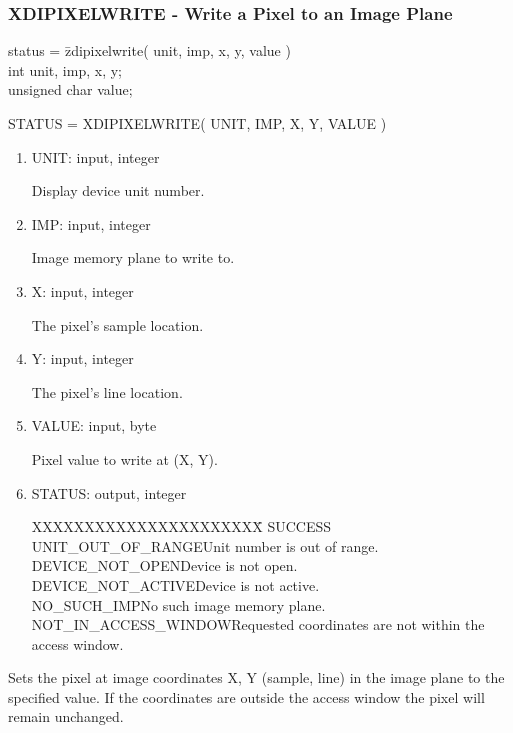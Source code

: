 \subsubsection{XDIPIXELWRITE - Write a Pixel to an Image Plane}
\begin{tabbing}
status = \=zdipixelwrite( unit, imp, x, y, value )\\
\>int  unit, imp, x, y;\\
\>unsigned char  value;\\
\end{tabbing}
STATUS = XDIPIXELWRITE( UNIT, IMP, X, Y, VALUE )
\begin{enumerate}
\item UNIT:  input, integer

Display device unit number.
\item IMP:  input, integer

Image memory plane to write to.
\item X:  input, integer

The pixel's sample location.
\item Y:  input, integer

The pixel's line location.
\item VALUE:  input, byte

Pixel value to write at (X, Y).
\item STATUS:  output, integer
\begin{tabbing}
XXXXXXXXXXXXXXXXXXXXXX\=\kill
SUCCESS\\
UNIT\_OUT\_OF\_RANGE\>Unit number is out of range.\\
DEVICE\_NOT\_OPEN\>Device is not open.\\
DEVICE\_NOT\_ACTIVE\>Device is not active.\\
NO\_SUCH\_IMP\>No such image memory plane.\\
NOT\_IN\_ACCESS\_WINDOW\>Requested coordinates are not within the access window.\\
\end{tabbing}
\end{enumerate}
Sets the pixel at image coordinates X, Y (sample, line) in the image
plane to the specified value.  If the coordinates are outside the
access window the pixel will remain unchanged.
\newpage
